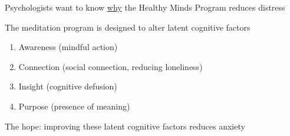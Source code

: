 \documentclass[aspectratio=169]{beamer}
\theoremstyle{remark}
\begin{document}
\begin{frame}{Psychologists want to know \underline{why} the Healthy Minds Program reduces distress}

    The meditation program is designed to alter latent cognitive factors

    \begin{enumerate}
        \item Awareness (mindful action)
        \item Connection (social connection, reducing loneliness)
        \item Insight (cognitive defusion)
        \item Purpose (presence of meaning)
    \end{enumerate}

    The hope: improving these latent cognitive factors reduces anxiety
\end{frame}
\end{document}
